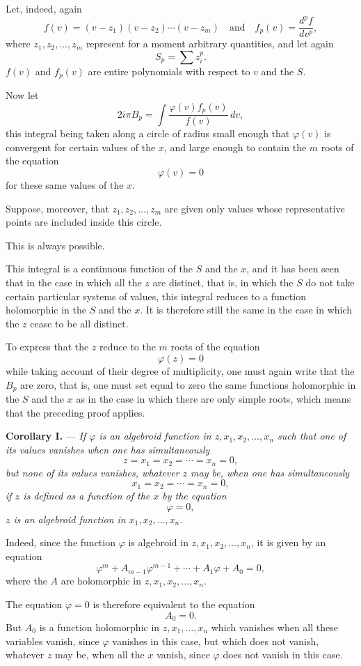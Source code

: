 \documentclass[11pt]{article}
\begin{document}
Let, indeed, again
\[
f(v)=(v-z_1)(v-z_2)\cdots(v-z_m)
\quad \text{and}\quad
f_p(v)=\frac{d^p f}{dv^p},
\]
where $z_1,z_2,\ldots,z_m$ represent for a moment arbitrary quantities, and let again
\[
S_p=\sum z_i^p.
\]
$f(v)$ and $f_p(v)$ are entire polynomials with respect to $v$ and the $S$.

Now let
\[
2i\pi B_p=\int \frac{\varphi(v)f_p(v)}{f(v)}\,dv,
\]
this integral being taken along a circle of radius small enough that $\varphi(v)$ is convergent for certain values of the $x$, and large enough to contain the $m$ roots of the equation
\[
\varphi(v)=0
\]
for these same values of the $x$.

Suppose, moreover, that $z_1,z_2,\ldots,z_m$ are given only values whose representative points are included inside this circle.

This is always possible.

This integral is a continuous function of the $S$ and the $x$, and it has been seen that in the case in which all the $z$ are distinct, that is, in which the $S$ do not take certain particular systems of values, this integral reduces to a function holomorphic in the $S$ and the $x$. It is therefore still the same in the case in which the $z$ cease to be all distinct.

To express that the $z$ reduce to the $m$ roots of the equation
\[
\varphi(z)=0
\]
while taking account of their degree of multiplicity, one must again write that the $B_p$ are zero, that is, one must set equal to zero the same functions holomorphic in the $S$ and the $x$ as in the case in which there are only simple roots, which means that the preceding proof applies.

\medskip
\noindent\textbf{Corollary I.} — \emph{If $\varphi$ is an algebroid function in $z,x_1,x_2,\ldots,x_n$ such that one of its values vanishes when one has simultaneously}
\[
z=x_1=x_2=\cdots=x_n=0,
\]
\emph{but none of its values vanishes, whatever $z$ may be, when one has simultaneously}
\[
x_1=x_2=\cdots=x_n=0,
\]
\emph{if $z$ is defined as a function of the $x$ by the equation}
\[
\varphi=0,
\]
\emph{$z$ is an algebroid function in $x_1,x_2,\ldots,x_n$.}

Indeed, since the function $\varphi$ is algebroid in $z,x_1,x_2,\ldots,x_n$, it is given by an equation
\[
\varphi^m+A_{m-1}\varphi^{m-1}+\cdots+A_1\varphi+A_0=0,
\]
where the $A$ are holomorphic in $z,x_1,x_2,\ldots,x_n$.

The equation $\varphi=0$ is therefore equivalent to the equation
\[
A_0=0.
\]
But $A_0$ is a function holomorphic in $z,x_1,\ldots,x_n$ which vanishes when all these variables vanish, since $\varphi$ vanishes in this case, but which does not vanish, whatever $z$ may be, when all the $x$ vanish, since $\varphi$ does not vanish in this case.
\end{document}
